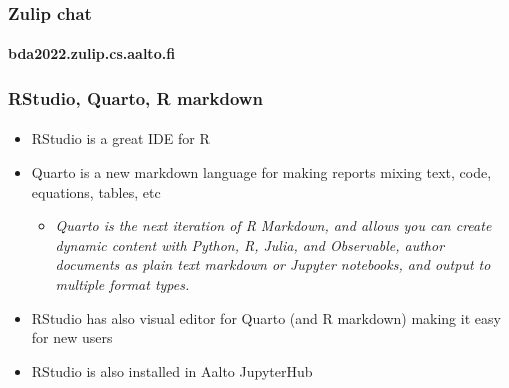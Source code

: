 \documentclass[english]{beamer}
\begin{document}
\begin{frame}

  \frametitle{Zulip chat}  %
  \framesubtitle{bda2022.zulip.cs.aalto.fi}
  
\end{frame}

\begin{frame}

  \frametitle{RStudio, Quarto, R markdown}  %
  \framesubtitle{}

  \begin{itemize}
  \item RStudio is a great IDE for R
  \item Quarto is a new markdown language for making reports mixing
    text, code, equations, tables, etc
    \begin{itemize}
    \item \textit{Quarto is the next iteration of R Markdown, and
        allows you can create dynamic content with Python, R, Julia,
        and Observable, author documents as plain text markdown or
        Jupyter notebooks, and output to multiple format types.}
    \end{itemize}
  \item RStudio has also visual editor for Quarto (and R markdown)
    making it easy for new users
  \item RStudio is also installed in Aalto JupyterHub
  \end{itemize}
  
\end{frame}  
\end{document}
